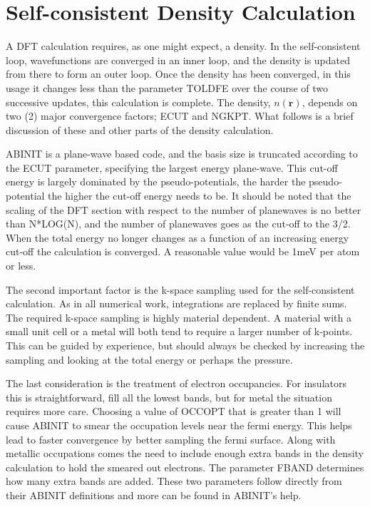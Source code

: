 \documentclass[11pt]{report}
\begin{document}
\section{Self-consistent Density Calculation}
A DFT calculation requires, as one might expect, a density. In the self-consistent loop, wavefunctions are converged in an inner loop, and the density is updated from there to form an outer loop. Once the density has been converged, in this usage it changes less than the parameter TOLDFE over the course of two successive updates, this calculation is complete. The density, $n(\mathbf{r})$, depends on two (2) major convergence factors; ECUT and NGKPT. What follows is a brief discussion of these and other parts of the density calculation.

ABINIT is a plane-wave based code, and the basis size is truncated according to the ECUT parameter, specifying the largest energy plane-wave. This cut-off energy is largely dominated by the pseudo-potentials, the harder the pseudo-potential the higher the cut-off energy needs to be. It should be noted that the scaling of the DFT section with respect to the number of planewaves is no better than N*LOG(N), and the number of planewaves goes as the cut-off to the 3/2. When the total energy no longer changes as a function of an increasing energy cut-off the calculation is converged. A reasonable value would be 1meV per atom or less.

The second important factor is the k-space sampling used for the self-consistent calculation. As in all numerical work, integrations are replaced by finite sums. The required k-space sampling is highly material dependent. A material with a small unit cell or a metal will both tend to require a larger number of k-points. This can be guided by experience, but should always be checked by increasing the sampling and looking at the total energy or perhaps the pressure. 

The last consideration is the treatment of electron occupancies. For insulators this is straightforward, fill all the lowest bands, but for metal the situation requires more care. Choosing a value of OCCOPT that is greater than 1 will cause ABINIT to smear the occupation levels near the fermi energy. This helps lead to faster convergence by better sampling the fermi surface. Along with metallic occupations comes the need to include enough extra bands in the density calculation to hold the smeared out electrons. The parameter FBAND determines how many extra bands are added. These two parameters follow directly from their ABINIT definitions and more can be found in ABINIT's help.
\end{document}
